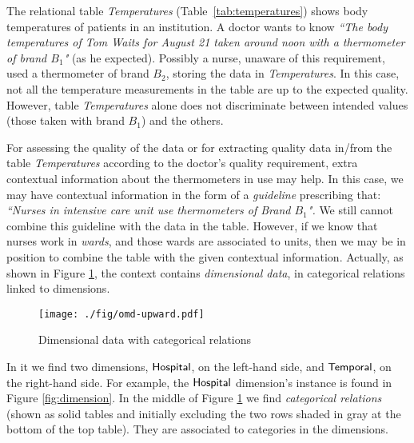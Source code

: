 \documentclass[format=acmsmall, review=false, screen=true]{acmart}
\newcommand{\red}[1]{{#1}}
\begin{document}
\begin{example}\label{ex:intr} The relational table {\it Temperatures} (Table~\ref{tab:temperatures}) shows body temperatures of patients in an institution. A doctor wants to know {\em ``The body temperatures of Tom Waits for August 21 taken around noon with a thermometer of brand $B_1$"}  (as he expected). Possibly a nurse, unaware of this requirement, used a thermometer of brand $B_2$, storing the data in {\it Temperatures}. In this case, not all the temperature measurements in the table are up to the expected quality. However, table  {\it Temperatures} alone does not discriminate between intended values (those taken with brand $B_1$) and the others.


For assessing the quality of the data or for extracting quality data in/from the table {\it Temperatures} according to the doctor's quality requirement, extra contextual information about the thermometers in use may help. In this case, we may have contextual information in the form of a {\em guideline} prescribing that: {\em ``Nurses in intensive care unit use thermometers of Brand $B_1$"\!.} We still cannot combine this guideline with the data in the table. However, if we know that nurses work in {\em wards}, and those wards are associated to {units}, then we may be in position to combine the table with the given contextual information. \red{Actually, as shown   in Figure \ref{fig:omdm0}, the context contains {\em dimensional data}, in categorical relations linked to dimensions.}

\begin{figure}[ht]
\begin{center}
\texttt{[image: ./fig/omd-upward.pdf]}%
 \caption{Dimensional data with categorical relations}\label{fig:omdm0} \vspace{-4mm}
\end{center}
\end{figure}



In it we find two dimensions, $\sf{Hospital}$, on the left-hand side, and $\sf{Temporal}$, on the right-hand side. For example, the $\sf{Hospital}$ dimension's instance is found in Figure \ref{fig:dimension}. In the middle of Figure \ref{fig:omdm0} we find {\em categorical relations} (shown as solid tables and initially excluding the two rows shaded
 in gray at the bottom of the top table). They  are associated to categories in the dimensions.



\end{example}
\end{document}
